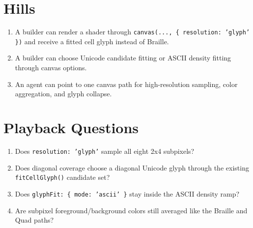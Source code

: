 \section{Hills}\label{record-162-hills}

\begin{enumerate}
\def\labelenumi{\arabic{enumi}.}
\tightlist
\item
  A builder can render a shader through \texttt{c\allowbreak{}a\allowbreak{}n\allowbreak{}v\allowbreak{}a\allowbreak{}s\allowbreak{}(\allowbreak{}.\allowbreak{}.\allowbreak{}.\allowbreak{},\allowbreak{} \allowbreak{}\{\allowbreak{} \allowbreak{}r\allowbreak{}e\allowbreak{}s\allowbreak{}o\allowbreak{}l\allowbreak{}u\allowbreak{}t\allowbreak{}i\allowbreak{}o\allowbreak{}n\allowbreak{}:\allowbreak{} \allowbreak{}'\allowbreak{}g\allowbreak{}l\allowbreak{}y\allowbreak{}p\allowbreak{}h\allowbreak{}'\allowbreak{} \allowbreak{}\}\allowbreak{})} and receive a fitted cell glyph instead of Braille.
\item
  A builder can choose Unicode candidate fitting or ASCII density fitting through canvas options.
\item
  An agent can point to one canvas path for high-resolution sampling, color aggregation, and glyph collapse.
\end{enumerate}

\section{Playback Questions}\label{record-162-playback-questions}

\begin{enumerate}
\def\labelenumi{\arabic{enumi}.}
\tightlist
\item
  Does \texttt{r\allowbreak{}e\allowbreak{}s\allowbreak{}o\allowbreak{}l\allowbreak{}u\allowbreak{}t\allowbreak{}i\allowbreak{}o\allowbreak{}n\allowbreak{}:\allowbreak{} \allowbreak{}'\allowbreak{}g\allowbreak{}l\allowbreak{}y\allowbreak{}p\allowbreak{}h\allowbreak{}'} sample all eight 2x4 subpixels?
\item
  Does diagonal coverage choose a diagonal Unicode glyph through the existing \texttt{f\allowbreak{}i\allowbreak{}t\allowbreak{}C\allowbreak{}e\allowbreak{}l\allowbreak{}l\allowbreak{}G\allowbreak{}l\allowbreak{}y\allowbreak{}p\allowbreak{}h\allowbreak{}(\allowbreak{})} candidate set?
\item
  Does \texttt{g\allowbreak{}l\allowbreak{}y\allowbreak{}p\allowbreak{}h\allowbreak{}F\allowbreak{}i\allowbreak{}t\allowbreak{}:\allowbreak{} \allowbreak{}\{\allowbreak{} \allowbreak{}m\allowbreak{}o\allowbreak{}d\allowbreak{}e\allowbreak{}:\allowbreak{} \allowbreak{}'\allowbreak{}a\allowbreak{}s\allowbreak{}c\allowbreak{}i\allowbreak{}i\allowbreak{}'\allowbreak{} \allowbreak{}\}} stay inside the ASCII density ramp?
\item
  Are subpixel foreground/background colors still averaged like the Braille and Quad paths?
\end{enumerate}

